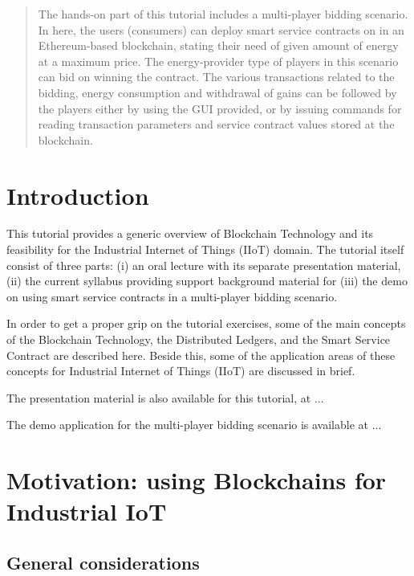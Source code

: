 \documentclass[a4paper]{article}
\begin{document}
\begin{abstract}
The hands-on part of this tutorial includes a multi-player bidding scenario.  In here, the users (consumers) can deploy smart service contracts on in an Ethereum-based blockchain, stating their need of given amount of energy at a maximum price. The energy-provider type of players in this scenario can bid on winning the contract. The various transactions related to the bidding, energy consumption and withdrawal of gains can be followed by the players either by using the GUI provided, or by issuing commands for reading transaction parameters and service contract values stored at the blockchain.

\end{abstract}

\newpage

\tableofcontents


\section{Introduction}

This tutorial provides a generic overview of Blockchain Technology and its feasibility for the  Industrial Internet of Things (IIoT) domain. The tutorial itself consist of three parts: (i) an oral lecture with its separate presentation material, (ii) the current syllabus providing support background material for (iii) the demo on using smart service contracts in a multi-player bidding scenario.

In order to get a proper grip on the tutorial exercises, some of the main concepts of the Blockchain Technology, the Distributed Ledgers, and the Smart Service Contract are described here.
Beside this, some of the application areas of these concepts for Industrial Internet of Things (IIoT) are discussed in brief.

The presentation material is also available for this tutorial, at ...

The demo application for the multi-player bidding scenario is available at ...


\section{Motivation: using Blockchains for Industrial IoT}

\subsection{General considerations}
\end{document}
